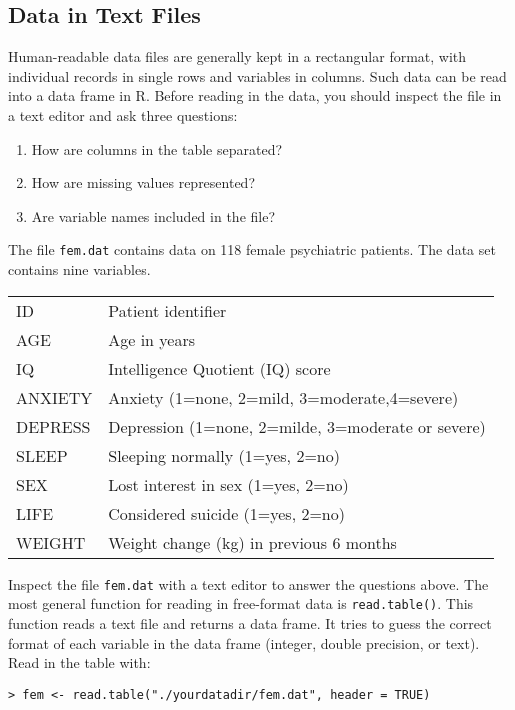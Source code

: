 \documentclass[12pt]{article}
\begin{document}
\subsection{Data in Text Files}
Human-readable data files are generally kept in a rectangular format, with individual records in
single rows and variables in columns. Such data can be read into a data frame in R.
Before reading in the data, you should inspect the file in a text editor and ask three questions:
\begin{enumerate}
\item  How are columns in the table separated?
\item  How are missing values represented?
\item  Are variable names included in the file?
\end{enumerate}
The file \texttt{fem.dat} contains data on 118 female psychiatric patients. The data set contains nine variables.

\begin{center}
\begin{tabular}{l l}
ID      & Patient identifier                     \\
AGE     & Age in years                           \\
IQ      & Intelligence Quotient (IQ) score       \\
ANXIETY & Anxiety (1=none, 2=mild, 3=moderate,4=severe)\\
DEPRESS & Depression (1=none, 2=milde, 3=moderate or severe)\\
SLEEP   & Sleeping normally (1=yes, 2=no)        \\
SEX     & Lost interest in sex (1=yes, 2=no)     \\
LIFE    & Considered suicide (1=yes, 2=no)       \\
WEIGHT  & Weight change (kg) in previous 6 months\\
\end{tabular}
\end{center}

Inspect the file \texttt{fem.dat} with a text editor to answer the questions above.
The most general function for reading in free-format data is \texttt{read.table()}. This function reads
a text file and returns a data frame. It tries to guess the correct format of each variable in the
data frame (integer, double precision, or text).
Read in the table with:

\begin{verbatim}
> fem <- read.table("./yourdatadir/fem.dat", header = TRUE)
\end{verbatim}
\end{document}
